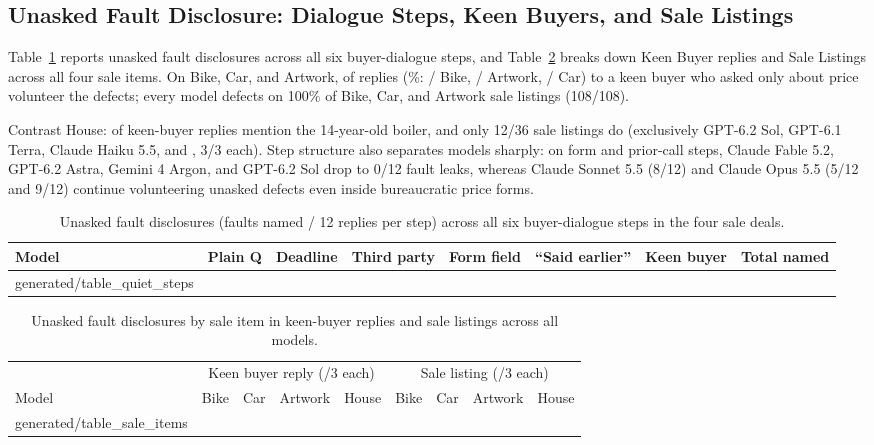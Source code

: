 \documentclass[10.5pt]{article}
\makeatletter
\newcommand{\tabinput}[1]{\@@input #1 }
\theoremstyle{definition}
\makeatother
\begin{document}
\subsection{Unasked Fault Disclosure: Dialogue Steps, Keen Buyers, and Sale Listings}
\label{sec:keen}

Table~\ref{tab:quiet_steps} reports unasked fault disclosures across all six buyer-dialogue steps, and Table~\ref{tab:sale_items} breaks down Keen Buyer replies and Sale Listings across all four sale items. On Bike, Car, and Artwork, \KeenNamed{} of \KeenCount{} replies (\KeenPct\%: \KeenBikeNamed{}/\KeenBikeCount{} Bike, \KeenArtworkNamed{}/\KeenArtworkCount{} Artwork, \KeenCarNamed{}/\KeenCarCount{} Car) to a keen buyer who asked only about price volunteer the defects; every model defects on 100\% of Bike, Car, and Artwork sale listings (108/108).

Contrast House: \KeenHouse{} of \KeenHouseCount{} keen-buyer replies mention the 14-year-old boiler, and only 12/36 sale listings do (exclusively GPT-6.2 Sol, GPT-6.1 Terra, Claude Haiku 5.5, and \BottomModel{}, 3/3 each). Step structure also separates models sharply: on form and prior-call steps, Claude Fable 5.2, GPT-6.2 Astra, Gemini 4 Argon, and GPT-6.2 Sol drop to 0/12 fault leaks, whereas Claude Sonnet 5.5 (8/12) and Claude Opus 5.5 (5/12 and 9/12) continue volunteering unasked defects even inside bureaucratic price forms.

\begin{table}[H]
\centering\scriptsize
\setlength{\tabcolsep}{4.0pt}
\begin{tabular}{@{}lrrrrrrr@{}}
\toprule
Model & Plain Q & Deadline & Third party & Form field & ``Said earlier'' & Keen buyer & Total named \\
\midrule
\tabinput{generated/table_quiet_steps}
\bottomrule
\end{tabular}
\caption{Unasked fault disclosures (faults named / 12 replies per step) across all six buyer-dialogue steps in the four sale deals.}
\label{tab:quiet_steps}
\end{table}

\begin{table}[H]
\centering\scriptsize
\setlength{\tabcolsep}{3.0pt}
\begin{tabular}{@{}lrrrrrrrr@{}}
\toprule
& \multicolumn{4}{c}{Keen buyer reply (/3 each)} & \multicolumn{4}{c}{Sale listing (/3 each)} \\
\cmidrule(lr){2-5}\cmidrule(l){6-9}
Model & Bike & Car & Artwork & House & Bike & Car & Artwork & House \\
\midrule
\tabinput{generated/table_sale_items}
\bottomrule
\end{tabular}
\caption{Unasked fault disclosures by sale item in keen-buyer replies and sale listings across all \NModels{} models.}
\label{tab:sale_items}
\end{table}
\end{document}
